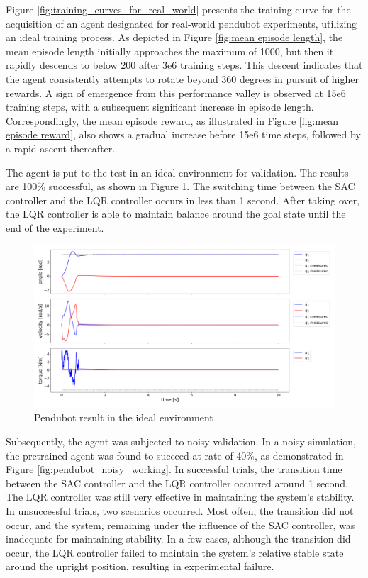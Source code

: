 Figure \ref{fig:training_curves_for_real_world} presents the training curve for the acquisition of an agent designated for real-world pendubot experiments, utilizing an ideal training process. As depicted in Figure \ref{fig:mean episode length}, the mean episode length initially approaches the maximum of 1000, but then it rapidly descends to below 200 after 3e6 training steps. This descent indicates that the agent consistently attempts to rotate beyond 360 degrees in pursuit of higher rewards. A sign of emergence from this performance valley is observed at 15e6 training steps, with a subsequent significant increase in episode length. Correspondingly, the mean episode reward, as illustrated in Figure \ref{fig:mean episode reward}, also shows a gradual increase before 15e6 time steps, followed by a rapid ascent thereafter.

The agent is put to the test in an ideal environment for validation. The results are 100\% successful, as shown in Figure \ref{fig:pendubot_ideal_working}. The switching time between the SAC controller and the LQR controller occurs in less than 1 second. After taking over, the LQR controller is able to maintain balance around the goal state until the end of the experiment.

\begin{figure}[H]
    \centering
    \includegraphics[width=0.95\linewidth]{figures/hardware_result/pendubot_ideal_validation_designC.1.png}
    \caption{Pendubot result in the ideal environment}
    \label{fig:pendubot_ideal_working}
\end{figure}

Subsequently, the agent was subjected to noisy validation. In a noisy simulation, the pretrained agent was found to succeed at rate of 40\%, as demonstrated in Figure \ref{fig:pendubot_noisy_working}. In successful trials, the transition time between the SAC controller and the LQR controller occurred around 1 second. The LQR controller was still very effective in maintaining the system's stability. In unsuccessful trials, two scenarios occurred. Most often, the transition did not occur, and the system, remaining under the influence of the SAC controller, was inadequate for maintaining stability. In a few cases, although the transition did occur, the LQR controller failed to maintain the system's relative stable state around the upright position, resulting in experimental failure.

